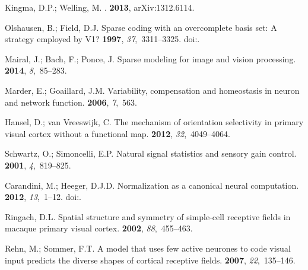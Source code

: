 \documentclass[vision,article,accept,oneauthor,pdftex]{Definitions/mdpi}
\begin{document}
\begin{thebibliography}{999}
{Kingma}, D.P.; {Welling}, M.
.
 {\bf 2013}, arXiv:1312.6114.

Olshausen, B.; Field, D.J.
\newblock Sparse coding with an overcomplete basis set: A strategy employed by
  {V1}?
 {\bf 1997}, {\em 37},~3311--3325.
\newblock
  doi:{\href{https://doi.org/10.1016/S0042-6989(97)00169-7}{}}.

Mairal, J.; Bach, F.; Ponce, J.
\newblock Sparse modeling for image and vision processing.
 {\bf
  2014}, {\em 8},~85--283.



  


Marder, E.; Goaillard, J.M.
\newblock Variability, compensation and homeostasis in neuron and network
  function.
 {\bf 2006}, {\em 7},~563.

Hansel, D.; van Vreeswijk, C.
\newblock The mechanism of orientation selectivity in primary visual cortex
  without a functional map.
 {\bf 2012}, {\em 32},~4049--4064.



Schwartz, O.; Simoncelli, E.P.
\newblock Natural signal statistics and sensory gain control.
 {\bf 2001}, {\em 4},~819--825.

Carandini, M.; Heeger, D.J.D.
\newblock Normalization as a canonical neural computation.
 {\bf 2012}, {\em 13},~1--12.
\newblock
  doi:{\href{https://doi.org/10.1038/nrn3136}{}}.

Ringach, D.L.
\newblock Spatial structure and symmetry of simple-cell receptive fields in
  macaque primary visual cortex.
 {\bf 2002}, {\em 88},~455--463.

Rehn, M.; Sommer, F.T.
\newblock A model that uses few active neurones to code visual input predicts
  the diverse shapes of cortical receptive fields.
 {\bf 2007}, {\em
  22},~135--146.


\end{thebibliography}
\end{document}
